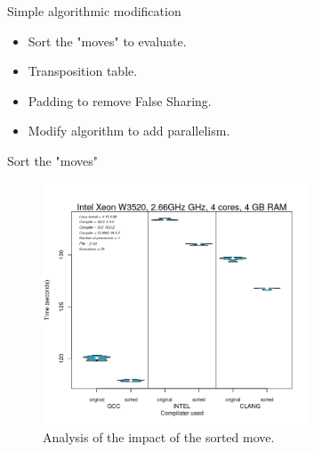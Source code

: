 \documentclass{beamer}
\begin{document}
\begin{frame}{Simple algorithmic modification}

\begin{itemize}
  \item
  Sort the "moves" to evaluate.
  \item
  Transposition table.
  \item
  Padding to remove False Sharing.
  \item
  Modify algorithm to add parallelism.
 \end{itemize}	
\end{frame}

\begin{frame}{Sort the "moves"}
	\begin{figure}
      \includegraphics[width=0.7\textwidth]{trie.png}
      \caption{Analysis of the impact of the sorted move.\label{Fig:trie}}
	\end{figure}
\end{frame}
\end{document}
